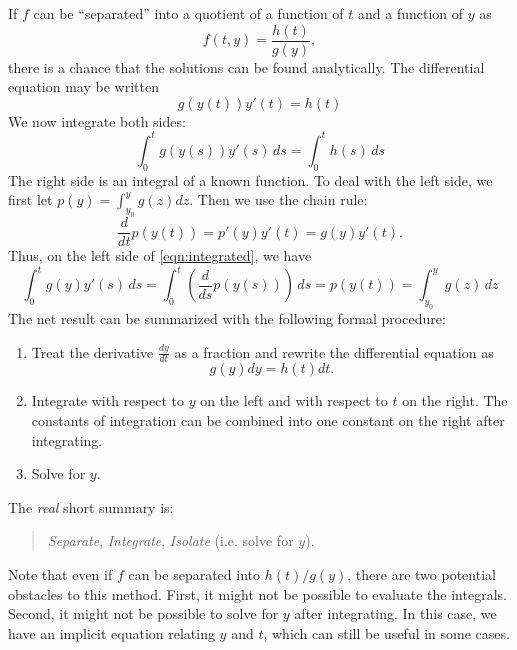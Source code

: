 \documentclass{book}
\begin{document}
\medskip
If $f$ can be ``separated'' into a quotient of a function of $t$ and a function
of $y$ as
\begin{equation}
   f(t,y) = \frac{h(t)}{g(y)},
\end{equation}
there is a chance that the solutions can
be found analytically.
The differential equation may be written
\begin{equation}
  g(y(t))y'(t) = h(t)
\label{eqn:separated}
\end{equation}
We now integrate both sides:
\begin{equation}
    \int_0^t g(y(s))y'(s) \, ds = \int_0^t h(s) \, ds
\label{eqn:integrated}
\end{equation}
The right side is an integral of a known function.
To deal with the left side, we first let $p(y) = \int_{y_0}^y g(z) dz$.
Then  we use the chain rule:
\begin{equation}
   \frac{d}{dt} p(y(t)) = p'(y)y'(t) = g(y)y'(t).
\end{equation}
Thus, on the left side of \eqref{eqn:integrated}, we have
\begin{equation}
  \int_0^t g(y)y'(s)\,ds = \int_0^t \left(\frac{d}{ds} p(y(s))\right)\, ds = p(y(t)) = 
    \int_{y_0}^y g(z) \, dz
\end{equation}
The net result can be summarized with the following formal procedure:
\begin{enumerate}
\item Treat the derivative $\frac{dy}{dt}$ as a fraction and rewrite the differential equation
as
\begin{equation}
   g(y)dy = h(t)dt.
\end{equation}
\item Integrate with respect to $y$ on the left and with respect to $t$ on the right.
The constants of integration can be combined into one constant on the right after
integrating.
\item Solve for $y$.
\end{enumerate}
The \emph{real} short summary is:
\begin{quote}
  \emph{Separate}, \emph{Integrate}, \emph{Isolate} (i.e. solve for $y$).
\end{quote}
Note that even if $f$ can be separated into $h(t)/g(y)$, there are two potential obstacles
to this method. First, it might not be possible to evaluate the integrals.
Second, it might not be possible to solve for $y$ after integrating.
In this case, we have an implicit equation relating $y$ and $t$, which can still
be useful in some cases.
\end{document}
